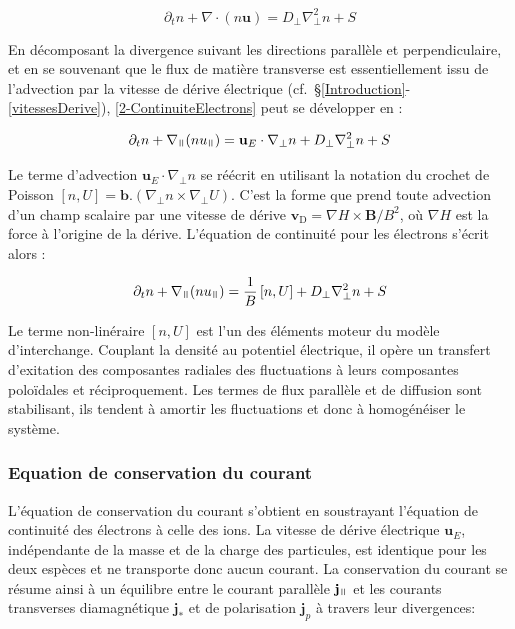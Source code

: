 \begin{refsection}
\begin{equation}
\label{2-ContinuiteElectrons}
\partial_t n + \nabla\cdot(n\mathbf{u}) = D_\perp\nabla^2_\perp n + S
\end{equation}

En décomposant la divergence suivant les directions parallèle et
perpendiculaire, et en se souvenant que le flux de matière transverse est
essentiellement issu de l'advection par la vitesse de dérive électrique
(cf.~§\ref{Introduction}-\ref{vitessesDerive}), \eqref{2-ContinuiteElectrons} peut se développer en :

\begin{equation}
\label{2-ContinuiteElectrons2}
\partial_t n + \nabla_\para(nu_{\para}) =
\mathbf{u}_E\cdot\nabla_\perp n + D_\perp\nabla^2_\perp n + S
\end{equation}

Le terme d'advection $\mathbf{u}_E\cdot\nabla_\perp
n$ se réécrit en utilisant la notation
du crochet de Poisson $[n,U]=\mathbf{b}.(\nabla_\perp n\times\nabla_\perp U)$.
C'est la forme que prend toute advection d'un champ scalaire par une vitesse de
dérive $\mathbf{v}_\text{D}=\nabla H\times\mathbf{B}/B^2$, où $\nabla H$ est la
force à l'origine de la dérive. L'équation de continuité pour les électrons
s'écrit alors :

\begin{equation}
\label{2-eqContinuiteFinale}
\partial_t n + \nabla_{\para}(nu_{\para}) =
\frac{1}{B}\left[n,U\right] + D_\perp\nabla^2_\perp n + S
\end{equation}

Le terme non-linéraire $[n,U]$ est l'un des éléments moteur du modèle
d'interchange. Couplant la densité au potentiel électrique, il opère un
transfert d'exitation des composantes radiales des fluctuations à leurs
composantes poloïdales et réciproquement. Les termes de flux parallèle et de
diffusion sont stabilisant, ils tendent à
amortir les fluctuations et donc à homogénéiser le système.

\subsubsection{Equation de conservation du courant}
L'équation de conservation du courant s'obtient en soustrayant l'équation de
continuité des électrons à celle des ions. La vitesse de dérive électrique
$\mathbf{u}_E$, indépendante de la masse et de la charge des particules,
est identique pour les deux espèces et ne transporte donc aucun courant. 
La conservation du courant se résume ainsi à un équilibre entre le courant
parallèle $\mathbf{j}_\para$ et les courants transverses diamagnétique
$\mathbf{j}_*$ et de polarisation $\mathbf{j}_p$ à travers leur
divergences:


\end{refsection}

